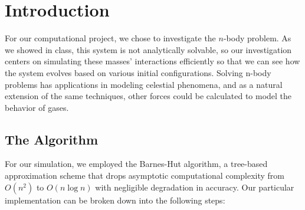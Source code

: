 \documentclass[cm, 10pt]{article}
\newcommand{\pn}[1]{\left( #1 \right)}
\begin{document}
\section{Introduction}
For our computational project, we chose to investigate the
$n$-body problem. As we showed in class, this system is not
analytically solvable, so our investigation centers on simulating
these masses’ interactions efficiently so that we can see how the
system evolves based on various initial configurations. Solving
n-body problems has applications in modeling celestial phenomena,
and as a natural extension of the same techniques, other forces
could be calculated to model the behavior of gases.
\subsection{The Algorithm}
For our simulation, we employed the Barnes-Hut algorithm, a
tree-based approximation scheme that drops asymptotic
computational complexity from $O\pn{n^2}$ to $O\pn{n\log{n}}$
with negligible degradation in accuracy. Our particular
implementation can be broken down into the following steps:
\end{document}
